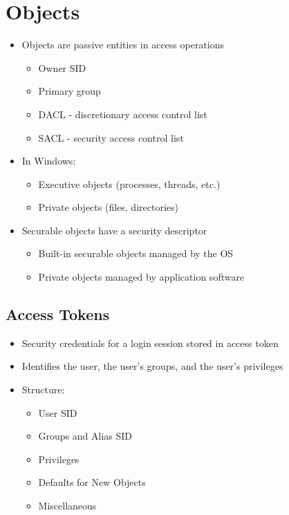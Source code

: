 \documentclass{article}
\begin{document}
\section{Objects}
\begin{itemize}
\item Objects are passive entities in access operations 
\begin{itemize}
  \item Owner SID
  \item Primary group
  \item DACL - discretionary access control list
  \item SACL - security access control list
\end{itemize}
\item In Windows: 
\begin{itemize}
\item Executive objects (processes, threads, etc.) 
\item Private objects (files, directories) 
\end{itemize}
\item Securable objects have a security descriptor 
\begin{itemize}
\item Built-in securable objects managed by the OS 
\item Private objects managed by application software
\end{itemize}
\end{itemize}

\subsection{Access Tokens}
\begin{itemize}
\item Security credentials for a login session stored in access token 
\item Identifies the user, the user’s groups, and the user’s privileges
\item Structure:
\begin{itemize}
  \item User SID
  \item Groups and Alias SID
  \item Privileges
  \item Defaults for New Objects
  \item Miscellaneous
\end{itemize}
\end{itemize}
\end{document}
